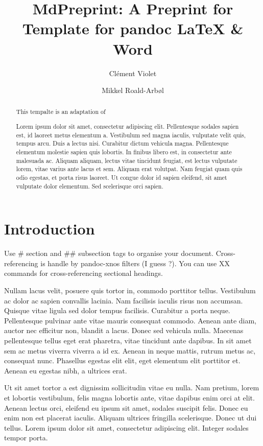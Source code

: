 \documentclass[9pt,biorxiv,doublespacing,lineno]{lapreprint}
\title{MdPreprint: A Preprint for Template for pandoc LaTeX \& Word}
\author[ \orcidlink{0000-0001-6217-5891} 1\Letter]{Clément Violet}
\author[ \orcidlink{0000-0002-9998-0058} 2]{Mikkel Roald-Arbøl}
\affil[1]{IFREMER, Centre de Bretagne, DYNECO LEBCO, Plouzané, France}
\affil[2]{School of Life Sciences, Univeristy of Sussex, Brighton and
Hove, Great Britain}
\begin{document}
\maketitle
\begin{abstract}

This tempalte is an adaptation of

Lorem ipsum dolor sit amet, consectetur adipiscing elit. Pellentesque
sodales sapien est, id laoreet metus elementum a. Vestibulum sed magna
iaculis, vulputate velit quis, tempus arcu. Duis a lectus nisi.
Curabitur dictum vehicula magna. Pellentesque elementum molestie sapien
quis lobortis. In finibus libero est, in consectetur ante malesuada ac.
Aliquam aliquam, lectus vitae tincidunt feugiat, est lectus vulputate
lorem, vitae varius ante lacus et sem. Aliquam erat volutpat. Nam
feugiat quam quis odio egestas, et porta risus laoreet. Ut congue dolor
id sapien eleifend, sit amet vulputate dolor elementum. Sed scelerisque
orci sapien.
\end{abstract}

\hypertarget{introduction}{%
\section{Introduction}\label{introduction}}

Use \# section and \#\# subsection tags to organise your document.
Cross-referencing is handle by pandoc-xnos filters (I guess ?). You can
use XX commands for cross-referencing sectional headings.

Nullam lacus velit, posuere quis tortor in, commodo porttitor tellus.
Vestibulum ac dolor ac sapien convallis lacinia. Nam facilisis iaculis
risus non accumsan. Quisque vitae ligula sed dolor tempus facilisis.
Curabitur a porta neque. Pellentesque pulvinar ante vitae mauris
consequat commodo. Aenean ante diam, auctor nec efficitur non, blandit a
lacus. Donec sed vehicula nulla. Maecenas pellentesque tellus eget erat
pharetra, vitae tincidunt ante dapibus. In sit amet sem ac metus viverra
viverra a id ex. Aenean in neque mattis, rutrum metus ac, consequat
nunc. Phasellus egestas elit elit, eget elementum elit porttitor et.
Aenean eu egestas nibh, a ultrices erat.

Ut sit amet tortor a est dignissim sollicitudin vitae eu nulla. Nam
pretium, lorem et lobortis vestibulum, felis magna lobortis ante, vitae
dapibus enim orci at elit. Aenean lectus orci, eleifend eu ipsum sit
amet, sodales suscipit felis. Donec eu enim non est placerat iaculis.
Aliquam ultrices fringilla scelerisque. Donec ut dui tellus. Lorem ipsum
dolor sit amet, consectetur adipiscing elit. Integer sodales tempor
porta.
\end{document}
